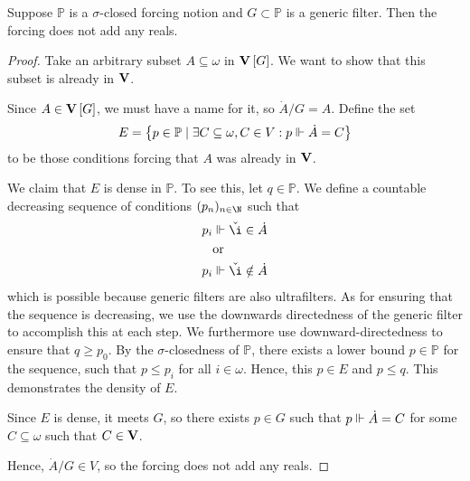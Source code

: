 \documentclass[11pt]{article}
\renewcommand{\P}{\mathbb{P}}
\begin{document}
\begin{prop}
    Suppose $\P$ is a $\sigma$-closed forcing notion and $G \subset \P$ is a
    generic filter. Then the forcing does not add any reals.
\end{prop}

\begin{proof}
    Take an arbitrary subset $A \subseteq \omega$ in $\m$.
    We want to show that this subset is already in $\verum$.

    Since $A \in \m$, we must have a name for it, so $\dot A / G = A$.
    Define the set
    \begin{equation*}
        E = \setof{
            p \in \P
            \sth
            \exists C \subseteq \omega, C \in V: p \forces \dot A = C
        }
    \end{equation*}
    to be those conditions forcing that $A$ was already in $\verum$.

    We claim that $E$ is dense in $\P$. To see this, let $q \in \P$.
    We define a countable decreasing sequence of conditions $(p_n)_{n\in\N}$
    such that
    \begin{align*}
        p_i &\forces \check \i \in \dot A \\
            &\text{or} \\
        p_i &\forces \check \i \notin \dot A
    \end{align*}
    which is possible because generic filters are also ultrafilters.
    As for ensuring that the sequence is decreasing, we use the downwards
    directedness of the generic filter to accomplish this at each step.
    We furthermore use downward-directedness to ensure that $q \geq p_0$.
    By the $\sigma$-closedness of $\P$, there exists a lower bound $p \in \P$
    for the sequence, such that $p \leq p_i$ for all $i \in \omega$.
    Hence, this $p \in E$ and $p \leq q$. This demonstrates the density of $E$.

    Since $E$ is dense, it meets $G$, so there exists $p \in G$ such that
    $p \Vdash \dot A = C$ for some $C \subseteq \omega$ such that
    $C \in \verum$.

    Hence, $\dot A / G \in V$, so the forcing does not add any reals.
\end{proof}
\end{document}
